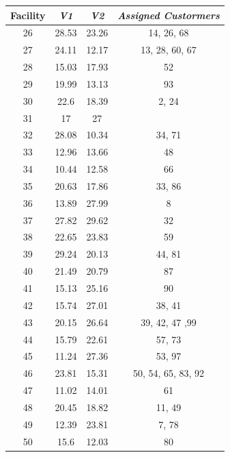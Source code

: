 \documentclass[12pt]{article}
\begin{document}
\begin{table}[h]
\begin{minipage}{.49\linewidth}
    \begin{tabular}{c|ccc|}
    \hline
    Facility & \textit{V1} & \textit{V2} & \textit{Assigned Custormers} \\
    \hline
26 & 28.53 & 23.26 &  14,  26, 68        \\
27 & 24.11 & 12.17 &  13,  28, 60, 67      \\
28 & 15.03 & 17.93 &  52            \\
29 & 19.99 & 13.13 &  93            \\
30 & 22.6 & 18.39 &   2,  24          \\
31 & 17 & 27 &             \\
32 & 28.08 & 10.34 &  34,  71          \\
33 & 12.96 & 13.66 &  48            \\
34 & 10.44 & 12.58 &  66            \\
35 & 20.63 & 17.86 &  33,  86          \\
36 & 13.89 & 27.99 &   8            \\
37 & 27.82 & 29.62 &  32            \\
38 & 22.65 & 23.83 &  59            \\
39 & 29.24 & 20.13 &  44,  81          \\
40 & 21.49 & 20.79 &  87            \\
41 & 15.13 & 25.16 &  90            \\
42 & 15.74 & 27.01 &  38,  41          \\
43 & 20.15 & 26.64 &  39,  42, 47 ,99      \\
44 & 15.79 & 22.61 &  57,  73          \\
45 & 11.24 & 27.36 &  53,  97          \\
46 & 23.81 & 15.31 &  50,  54, 65, 83, 92    \\
47 & 11.02 & 14.01 &  61            \\
48 & 20.45 & 18.82 &  11,  49          \\
49 & 12.39 & 23.81 &   7,  78          \\
50 & 15.6 & 12.03 &  80            \\

    \hline
    \end{tabular}
    \end{minipage}
\end{table}
\end{document}
